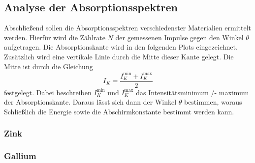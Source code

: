 

\subsection{Analyse der Absorptionsspektren}

Abschließend sollen die Absorptionsspektren verschiedenster Materialien ermittelt werden.
Hierfür wird die Zählrate $N$ der gemessenen Impulse gegen den Winkel $\theta$ aufgetragen.
Die Absorptionskante wird in den folgenden Plots eingezeichnet.
Zusätzlich wird eine vertikale Linie durch die Mitte dieser Kante gelegt.
Die Mitte ist durch die Gleichung
\begin{equation*}
  I_K = \frac{I_K^\text{min} + I_K^\text{max}}{2}
\end{equation*}
festgelegt. Dabei beschreiben $I_K^\text{min}$ und $I_K^\text{max}$ das Intensitätsminimum /- maximum der Absorptionskante.
Daraus lässt sich dann der Winkel $\theta$ bestimmen, woraus Schließlich die Energie sowie die Abschirmkonstante bestimmt werden kann.

\subsubsection{Zink}

\subsubsection{Gallium}

